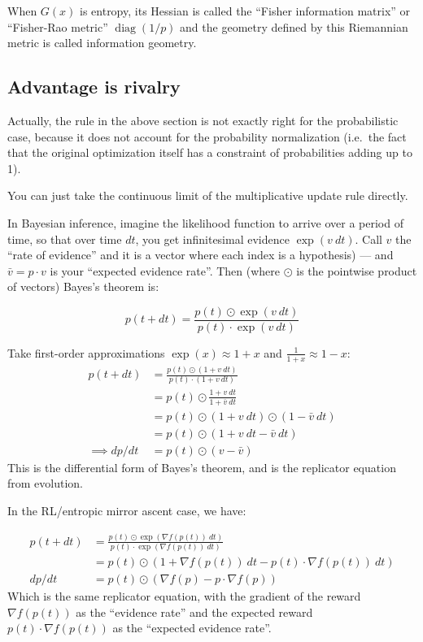When \(G(x)\) is entropy, its Hessian is called the ``Fisher information matrix'' or ``Fisher-Rao metric'' \(\operatorname{diag}(1/p)\) and the geometry defined by this Riemannian metric is called information geometry.

\hypertarget{advantage-is-rivalry}{%
\subsection{Advantage is rivalry}\label{advantage-is-rivalry}}

Actually, the rule in the above section is not exactly right for the probabilistic case, because it does not account for the probability normalization (i.e.~the fact that the original optimization itself has a constraint of probabilities adding up to 1).

You can just take the continuous limit of the multiplicative update rule directly.

In Bayesian inference, imagine the likelihood function to arrive over a period of time, so that over time \(dt\), you get infinitesimal evidence \(\exp(v\ dt)\). Call \(v\) the ``rate of evidence'' and it is a vector where each index is a hypothesis) --- and \(\bar{v}=p\cdot v\) is your ``expected evidence rate''. Then (where \(\odot\) is the pointwise product of vectors) Bayes's theorem is:

\[p(t+dt)=\frac{p(t)\odot\exp(v\ dt)}{p(t)\cdot \exp(v\ dt)}\]

Take first-order approximations \(\exp(x)\approx 1 + x\) and \(\frac1{1+x}\approx 1-x\): \[\begin{aligned}p(t+dt)&=\frac{p(t)\odot (1+ v\ dt)}{p(t)\cdot (1+ v\ dt)}\\
&=p(t)\odot \frac{1+ v\ dt}{1 + \bar{v}\ dt}\\
&= p(t)\odot (1+v\ dt) \odot (1-\bar{v}\ dt)\\
&= p(t)\odot (1+v\ dt-\bar{v}\ dt)\\
\implies dp/dt&= p(t)\odot(v-\bar{v})
\end{aligned}\] This is the differential form of Bayes's theorem, and is the replicator equation from evolution.

In the RL/entropic mirror ascent case, we have:

\[
\begin{aligned}p(t+dt) &=\frac{p(t)\odot \exp\left(\nabla f(p(t))\ dt\right)}{p(t)\cdot \exp\left(\nabla f(p(t))\ dt\right)}\\
&= p(t)\odot (1 +\nabla f(p(t))\ dt-p(t)\cdot \nabla f(p(t))\ dt)\\
dp/dt&= p(t)\odot (\nabla f(p)-p\cdot \nabla f(p))
\end{aligned}\] Which is the same replicator equation, with the gradient of the reward \(\nabla f(p(t))\) as the ``evidence rate'' and the expected reward \(p(t)\cdot \nabla f(p(t))\) as the ``expected evidence rate''.

